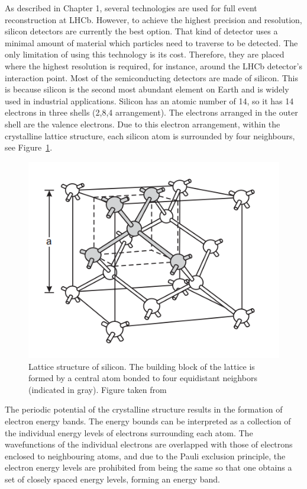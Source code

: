 As described in Chapter 1, several technologies are used for full event reconstruction at LHCb.  However, to achieve the highest precision and resolution, silicon detectors are currently the best option. That kind of detector uses a minimal amount of material which particles need to traverse to be detected.  The only limitation of using this technology is its cost. Therefore, they are placed where the highest resolution is required, for instance, around the LHCb detector's interaction point. 
Most of the semiconducting detectors are made of silicon.  This is because silicon is the second most abundant element on Earth and is widely used in industrial applications. Silicon has an atomic number of 14, so it has 14 electrons in three shells (2,8,4 arrangement). The electrons arranged in the outer shell are the valence electrons.  Due to this electron arrangement, within the crystalline lattice structure, each silicon atom is surrounded by four neighbours, see Figure~\ref{fig:silicon}.  

\begin{figure}[h]
\centering
\includegraphics{figures/silicon.PNG}
\caption{Lattice structure of silicon. The building block of the lattice is formed by a central atom bonded to four
equidistant neighbors (indicated in gray). Figure taken from~\cite{semiconductors_det_sys}}
\label{fig:silicon}
\end{figure}


The periodic potential of the crystalline structure results in the formation of electron energy bands. The energy bounds can be interpreted as a collection of the individual energy levels of electrons surrounding each atom. The wavefunctions of the individual electrons are overlapped with those of electrons enclosed to neighbouring atoms, and due to the Pauli exclusion principle, the electron energy levels are prohibited from being the same so that one obtains a set of closely spaced energy levels, forming an energy band. 

